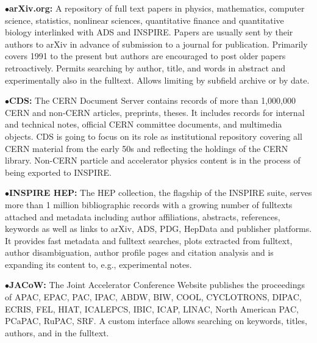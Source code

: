       \item{}

\medskip

\item{$\bullet$}{\bf arXiv.org:}
A repository of full text papers in physics, mathematics, computer science, statistics, nonlinear sciences, quantitative finance and quantitative biology interlinked with ADS and INSPIRE. Papers are usually sent by their authors to arXiv in advance of submission to a journal for publication. Primarily covers 1991 to the present but authors are encouraged to post older papers retroactively. Permits searching by author, title, and words in abstract and experimentally also in the fulltext. Allows limiting by subfield archive or by date.

	\item{}
\medskip

\item{$\bullet$}{\bf CDS:}
The CERN Document Server contains records of more than 1,000,000 CERN and non-CERN articles, preprints, theses. It includes records for internal and technical notes, official CERN committee documents, and multimedia objects. CDS is going to focus on its role as institutional repository covering all CERN material from the early 50s and reflecting the holdings of the CERN library. Non-CERN particle and accelerator physics content is in the process of being exported to INSPIRE.

      \item{}
\medskip



\item{$\bullet$}{\bf INSPIRE HEP:} 
The HEP collection, the flagship of the INSPIRE suite, serves more than 1 million bibliographic records with a growing number of fulltexts attached and metadata including author affiliations, abstracts, references, keywords as well as links to arXiv, ADS, PDG, HepData and publisher platforms. It provides fast metadata and fulltext searches, plots extracted from fulltext, author disambiguation, author profile pages and citation analysis and is expanding its content to, e.g., experimental notes.

   \item{}
\medskip


\item{$\bullet$}{\bf JACoW:}
The Joint Accelerator Conference Website publishes the proceedings of APAC, EPAC, PAC, IPAC, ABDW, BIW, COOL, CYCLOTRONS, DIPAC, ECRIS, FEL, HIAT, ICALEPCS, IBIC, ICAP, LINAC, North American PAC, PCaPAC, RuPAC, SRF. A custom interface allows searching on keywords, titles, authors, and in the fulltext.

